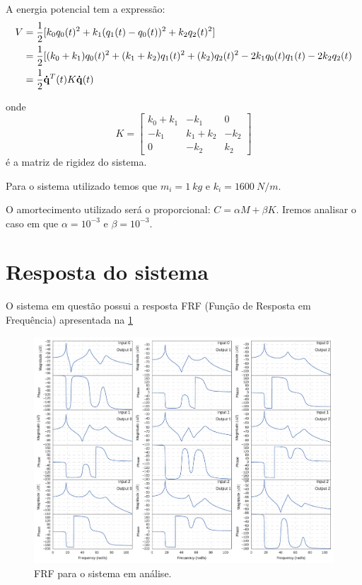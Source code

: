 A energia potencial tem a expressão:
\begin{equation}
\begin{split}
V &= \frac{1}{2}[k_0 q_0(t)^2 + k_1(q_1(t) - q_0(t))^2 + k_2 q_2(t)^2] \\
&= \frac{1}{2}[(k_0+k_1)q_0(t)^2 + (k_1+k_2)q_1(t)^2 + (k_2)q_2(t)^2 -2k_1  q_0(t)q_1(t) - 2k_2 q_2(t) \\
&= \frac{1}{2}{\bf \dot{q}}^T(t) K  {\bf \dot{q}}(t)
\end{split}
\end{equation}

onde
\begin{equation*}
K = 
\begin{bmatrix} 
k_0 +k_1 & -k_1 & 0\\
-k_1 & k_1+k_2 & -k_2 \\
0 & -k_2 & k_2
\end{bmatrix}
\end{equation*}   
é a matriz de rigidez do sistema.

Para o sistema utilizado temos que $m_i = 1 \ kg$ e $k_i = 1600 \ N/m$.

O amortecimento utilizado será o proporcional: $C = \alpha M + \beta K$. Iremos analisar o caso em que $\alpha = 10^{-3}$ e $\beta = 10^{-3}$.

\section{Resposta do sistema}

O sistema em questão possui a resposta  FRF (Função de Resposta em Frequência) apresentada na \cref{fig:FRF_all}

\begin{figure}[!h]
	\centering
	\includegraphics[trim={2.5cm, 1cm, 2.5cm, 2.5cm}, scale=0.55]{IMGS/FRF_all}
	\caption{FRF para o sistema em análise.}
	\label{fig:FRF_all}
\end{figure}


